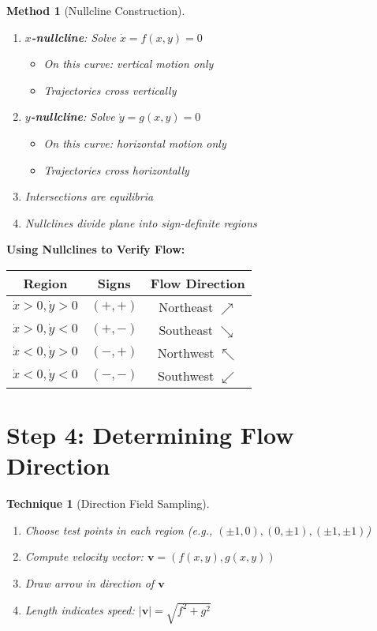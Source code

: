 \documentclass[12pt]{article}
\newtheorem{method}{Method}
\newtheorem{technique}{Technique}
\begin{document}
\begin{method}[Nullcline Construction]
\begin{enumerate}
    \item \textbf{$x$-nullcline}: Solve $\dot{x} = f(x,y) = 0$
    \begin{itemize}
        \item On this curve: vertical motion only
        \item Trajectories cross vertically
    \end{itemize}
    \item \textbf{$y$-nullcline}: Solve $\dot{y} = g(x,y) = 0$
    \begin{itemize}
        \item On this curve: horizontal motion only
        \item Trajectories cross horizontally
    \end{itemize}
    \item Intersections are equilibria
    \item Nullclines divide plane into sign-definite regions
\end{enumerate}
\end{method}

\begin{checkwork}
\textbf{Using Nullclines to Verify Flow:}
\begin{center}
\begin{tabular}{|c|c|c|}
\hline
\textbf{Region} & \textbf{Signs} & \textbf{Flow Direction} \\
\hline
$\dot{x} > 0, \dot{y} > 0$ & $(+,+)$ & Northeast $\nearrow$ \\
$\dot{x} > 0, \dot{y} < 0$ & $(+,-)$ & Southeast $\searrow$ \\
$\dot{x} < 0, \dot{y} > 0$ & $(-,+)$ & Northwest $\nwarrow$ \\
$\dot{x} < 0, \dot{y} < 0$ & $(-,-)$ & Southwest $\swarrow$ \\
\hline
\end{tabular}
\end{center}
\end{checkwork}

\section{Step 4: Determining Flow Direction}

\begin{technique}[Direction Field Sampling]
\begin{enumerate}
    \item Choose test points in each region (e.g., $(\pm1, 0), (0, \pm1), (\pm1, \pm1)$)
    \item Compute velocity vector: $\mathbf{v} = (f(x,y), g(x,y))$
    \item Draw arrow in direction of $\mathbf{v}$
    \item Length indicates speed: $|\mathbf{v}| = \sqrt{f^{2} + g^{2}}$
\end{enumerate}
\end{technique}
\end{document}
